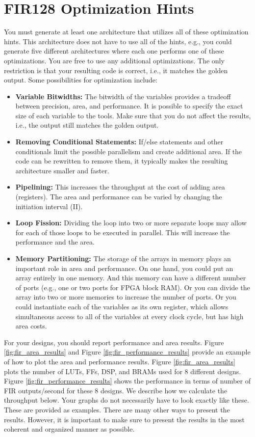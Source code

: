 \section{FIR128 Optimization Hints}
You must generate at least one architecture that utilizes all of these optimization hints. This architecture does not have to use all of the hints, e.g., you could generate five different architectures where each one performs one of these optimizations. You are free to use any additional optimizations. The only restriction is that your resulting code is correct, i.e., it matches the golden output.
Some possibilities for optimization include:
\begin{itemize}
\item \textbf{Variable Bitwidths:} The bitwidth of the variables provides a tradeoff between precision, area, and performance. It is possible to specify the exact size of each variable to the tools. Make sure that you do not affect the results, i.e., the output still matches the golden output.
\item \textbf{Removing Conditional Statements:} If/else statements and other conditionals limit the possible parallelism and create additional area. If the code can be rewritten to remove them, it typically makes the resulting architecture smaller and faster.
\item \textbf{Pipelining:} This increases the throughput at the cost of adding area (registers). The area and performance can be varied by changing the initiation interval (II).
\item \textbf{Loop Fission:} Dividing the loop into two or more separate loops may allow for each of those loops to be executed in parallel. This will increase the performance and the area.
\item \textbf{Memory Partitioning:} The storage of the arrays in memory plays an important role in area and performance. On one hand, you could put an array entirely in one memory. And this memory can have a different number of ports (e.g., one or two ports for FPGA block RAM). Or you can divide the array into two or more memories to increase the number of ports. Or you could instantiate each of the variables as its own register, which allows simultaneous access to all of the variables at every clock cycle, but has high area costs. 
\end{itemize}

For your designs, you should report performance and area results. Figure \ref{fig:fir_area_results} and Figure \ref{fig:fir_performance_results} provide an example of how to plot the area and performance results. Figure \ref{fig:fir_area_results} plots the number of LUTs, FFs, DSP, and BRAMs used for 8 different designs. Figure \ref{fig:fir_performance_results} shows the performance in terms of number of FIR outputs/second for these 8 designs.  We describe how we calculate the throughput below. Your graphs do not necessarily have to look exactly like these. These are provided as examples. There are many other ways to present the results. However, it is important to make sure to present the results in the most coherent and organized manner as possible.


